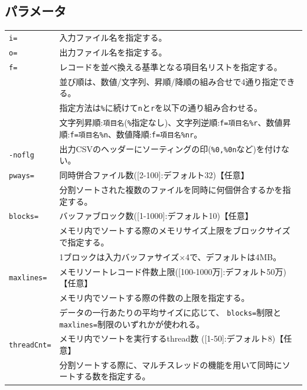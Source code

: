 \subsection*{パラメータ}
\begin{table}[htbp]
{\small
\begin{tabular}{ll}
\verb|i=|    & 入力ファイル名を指定する。\\
\verb|o=|    & 出力ファイル名を指定する。\\ 
\verb|f=|    & レコードを並べ換える基準となる項目名リストを指定する。\\
             & 並び順は、数値/文字列、昇順/降順の組み合せで4通り指定できる。\\
             & 指定方法は\verb|%|に続けて\verb|n|と\verb|r|を以下の通り組み合わせる。\\
             & 文字列昇順:\verb|項目名|(\verb|%|指定なし)、文字列逆順:\verb|f=項目名%r|、数値昇順:\verb|f=項目名%n|、数値降順:\verb|f=項目名%nr|。\\
\verb|-noflg| & 出力CSVのヘッダーにソーティングの印(\verb|%0,%0n|など)を付けない。\\

\verb|pways=|    & 同時併合ファイル数([2-100]:デフォルト32)【任意】\\
                 & 分割ソートされた複数のファイルを同時に何個併合するかを指定する。\\
\verb|blocks=|   & バッファブロック数([1-1000]:デフォルト10)【任意】\\
                 & メモリ内でソートする際のメモリサイズ上限をブロックサイズで指定する。\\
                 & 1ブロックは入力バッファサイズ×4で、デフォルトは4MB。\\
\verb|maxlines=| & メモリソートレコード件数上限([100-1000万]:デフォルト50万)【任意】\\
                 & メモリ内でソートする際の件数の上限を指定する。\\
                 & データの一行あたりの平均サイズに応じて、
                   \verb|blocks=|制限と\verb|maxlines=|制限のいずれかが使われる。\\
\verb|threadCnt=|& メモリ内でソートを実行するthread数 ([1-50]:デフォルト8)【任意】\\
& 分割ソートする際に、マルチスレッドの機能を用いて同時にソートする数を指定する。\\



\end{tabular}}
\end{table}
